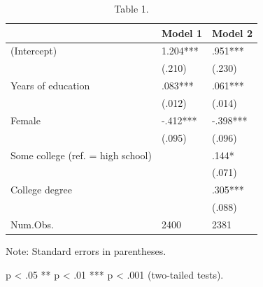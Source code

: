 \begin{table}[!t]
\centering
\caption{Table 1.}
\begin{threeparttable}
\begin{tabular}{lll}
\toprule
& Model 1 & Model 2 \\ \midrule
(Intercept) & 1.204*** & .951*** \\
& (.210) & (.230) \\
Years of education & .083*** & .061*** \\
& (.012) & (.014) \\
Female & -.412*** & -.398*** \\
& (.095) & (.096) \\
Some college (ref. = high school) &  & .144* \\
&  & (.071) \\
College degree &  & .305*** \\
&  & (.088) \\
Num.Obs. & 2400 & 2381 \\
\bottomrule
\end{tabular}
\begin{tablenotes}[flushleft]\footnotesize
\item Note: Standard errors in parentheses.
\item * p < .05  ** p < .01  *** p < .001 (two-tailed tests).
\end{tablenotes}
\end{threeparttable}
\end{table}

